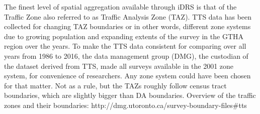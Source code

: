The finest level of spatial aggregation available through iDRS is that of the Traffic Zone also referred to as Traffic Analysis Zone (TAZ).
TTS data has been collected for changing TAZ boundaries or in other words, different zone systems due to growing population and expanding extents of the survey in the GTHA region over the years.
To make the TTS data consistent for comparing over all years from 1986 to 2016, the data management group (DMG), the custodian of the dataset derived from TTS, made all surveys available in the 2001 zone system, for convenience of researchers.
Any zone system could have been chosen for that matter.
Not as a rule, but the TAZs roughly follow census tract boundaries, which are slightly bigger than DA boundaries.
Overview of the traffic zones and their boundaries: http://dmg.utoronto.ca/survey-boundary-files#tts

